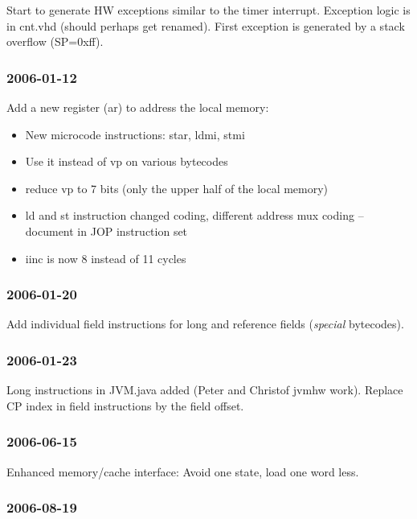 \documentclass[a4paper,12pt]{scrartcl}
\newcommand{\code}[1]{{\textsf{#1}}}
\begin{document}
Start to generate HW exceptions similar to the timer interrupt.
Exception logic is in \code{cnt.vhd} (should perhaps get renamed).
First exception is generated by a stack overflow (SP=0xff).

\subsubsection*{2006-01-12}

Add a new register (\code{ar}) to address the local memory:

\begin{itemize}
    \item New microcode instructions: star, ldmi, stmi
    \item Use it instead of vp on various bytecodes
    \item reduce vp to 7 bits (only the upper half of the local
    memory)
    \item ld and st instruction changed coding, different address
    mux coding -- document in JOP instruction set
    \item iinc is now 8 instead of 11 cycles
\end{itemize}

\subsubsection*{2006-01-20}

Add individual field instructions for long and reference fields
(\emph{special} bytecodes).



\subsubsection*{2006-01-23}

Long instructions in JVM.java added (Peter and Christof jvmhw work).
Replace CP index in field instructions by the field offset.

\subsubsection*{2006-06-15}

Enhanced memory/cache interface: Avoid one state, load one word
less.

\subsubsection*{2006-08-19}
\end{document}
